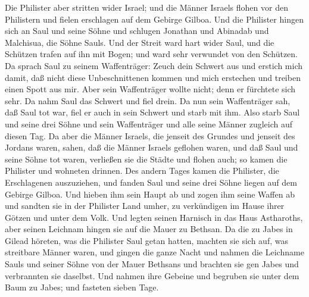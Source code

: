  Die Philister aber stritten wider Israel; und die Männer
Israels flohen vor den Philistern und fielen erschlagen auf dem Gebirge
Gilboa.  Und die Philister hingen sich an Saul und seine
Söhne und schlugen Jonathan und Abinadab und Malchisua, die Söhne Sauls.
 Und der Streit ward hart wider Saul, und die Schützen
trafen auf ihn mit Bogen; und ward sehr verwundet von den Schützen.
 Da sprach Saul zu seinem Waffenträger: Zeuch dein Schwert
aus und erstich mich damit, daß nicht diese Unbeschnittenen kommen und
mich erstechen und treiben einen Spott aus mir. Aber sein Waffenträger
wollte nicht; denn er fürchtete sich sehr. Da nahm Saul das Schwert und
fiel drein.  Da nun sein Waffenträger sah, daß Saul tot war,
fiel er auch in sein Schwert und starb mit ihm.  Also starb
Saul und seine drei Söhne und sein Waffenträger und alle seine Männer
zugleich auf diesen Tag.  Da aber die Männer Israels, die
jenseit des Grundes und jenseit des Jordans waren, sahen, daß die Männer
Israels geflohen waren, und daß Saul und seine Söhne tot waren,
verließen sie die Städte und flohen auch; so kamen die Philister und
wohneten drinnen.  Des andern Tages kamen die Philister, die
Erschlagenen auszuziehen, und fanden Saul und seine drei Söhne liegen
auf dem Gebirge Gilboa.  Und hieben ihm sein Haupt ab und
zogen ihm seine Waffen ab und sandten sie in der Philister Land umher,
zu verkündigen im Hause ihrer Götzen und unter dem Volk. 
Und legten seinen Harnisch in das Haus Astharoths, aber seinen Leichnam
hingen sie auf die Mauer zu Bethsan.  Da die zu Jabes in
Gilead höreten, was die Philister Saul getan hatten, 
machten sie sich auf, was streitbare Männer waren, und gingen die ganze
Nacht und nahmen die Leichname Sauls und seiner Söhne von der Mauer
Bethsans und brachten sie gen Jabes und verbrannten sie daselbst.
 Und nahmen ihre Gebeine und begruben sie unter dem Baum zu
Jabes; und fasteten sieben Tage.
